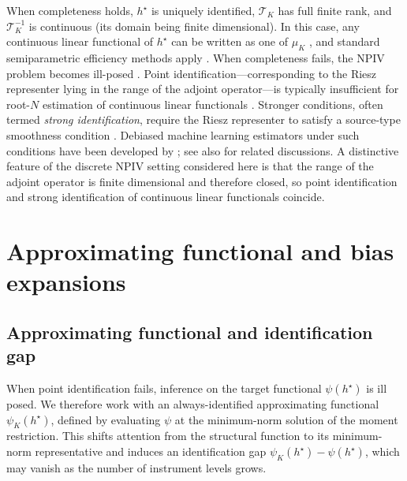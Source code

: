 \documentclass[11pt]{article}
\theoremstyle{plain}
\theoremstyle{definition}
\theoremstyle{remark}
\theoremstyle{definition}
\begin{document}
When completeness holds, \(h^\star\) is uniquely identified,
\(\mathcal{T}_K\) has full finite rank, and \(\mathcal{T}_K^{-1}\) is
continuous (its domain being finite dimensional). In this case, any continuous
linear functional of \(h^\star\) can be written as one of \(\mu_K\)
\citep{newey2003instrumental, blundell2007semi, carrasco2007linear,
newey2013nonparametric}, and standard semiparametric efficiency methods apply
\citep{bickel1993efficient, laan2003unified, vanderLaanRose2011, DoubleML}. When completeness fails, the NPIV problem becomes ill-posed
\citep{newey2003instrumental, hall2005nonparametric, severini2006some,
blundell2007semi, chen2013optimal}. Point identification---corresponding to the
Riesz representer lying in the range of the adjoint operator---is typically insufficient
for root-\(N\) estimation of continuous linear functionals
\citep{severini2006some, carrasco2007linear, babii2017identification,
smucler2025asymptotic}. Stronger conditions, often termed \emph{strong
identification}, require the Riesz representer to satisfy a source-type
smoothness condition
\citep{carrasco2007linear, babii2020completeness, bennett2023inference,
bennett2023source}. Debiased machine learning estimators under such conditions
have been developed by \citet{bennett2023inference, bennett2023source}; see also
\citet{chen2011rate, chen2012estimation, darolles2011nonparametric,
horowitz2011applied} for related discussions. A distinctive feature of the
discrete NPIV setting considered here is that the range of the adjoint operator
is finite dimensional and therefore closed, so point identification and strong
identification of continuous linear functionals coincide.

  

 

\section{Approximating functional and bias expansions}
 


\label{sec::identification}

 

\subsection{Approximating functional and identification gap}

When point identification fails, inference on the target functional
\(\psi(h^\star)\) is ill posed. We therefore work with an always-identified
approximating functional \(\psi_K(h^\star)\), defined by evaluating \(\psi\) at
the minimum-norm solution of the moment restriction. This shifts attention from
the structural function to its minimum-norm representative and induces an
identification gap \(\psi_K(h^\star) - \psi(h^\star)\), which may vanish as the
number of instrument levels grows.
\end{document}
